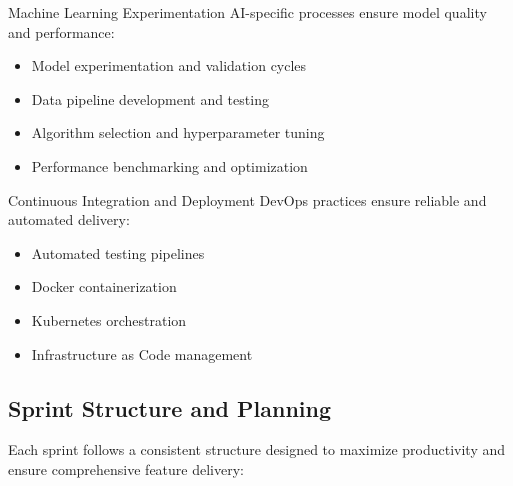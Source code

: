 \begin{sprintbox}{Machine Learning Experimentation}
AI-specific processes ensure model quality and performance:
\begin{itemize}
    \item Model experimentation and validation cycles
    \item Data pipeline development and testing
    \item Algorithm selection and hyperparameter tuning
    \item Performance benchmarking and optimization
\end{itemize}
\end{sprintbox}

\begin{sprintbox}{Continuous Integration and Deployment}
DevOps practices ensure reliable and automated delivery:
\begin{itemize}
    \item Automated testing pipelines
    \item Docker containerization
    \item Kubernetes orchestration
    \item Infrastructure as Code management
\end{itemize}
\end{sprintbox}

\subsection{Sprint Structure and Planning}

Each sprint follows a consistent structure designed to maximize productivity and ensure comprehensive feature delivery:

